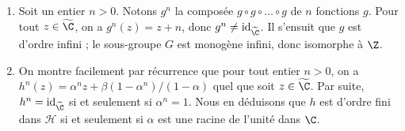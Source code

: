 \begin{enumerate}
  \item 
    Soit un entier $n > 0$.
    Notons $g^n$ la composée $g \circ g \circ \dots \circ g$ de $n$ fonctions $g$.
    Pour tout $z\in\widetilde{\C}$, on a $g^n(z) = z + n$, donc $g^n \neq \mathrm{id}_{\widetilde{\C}}$.
    Il s'ensuit que $g$ est d'ordre infini ; le sous-groupe $G$ est monogène infini, donc isomorphe à $\Z$.
  \item
    On montre facilement par récurrence que pour tout entier $n > 0$, on a $h^n(z) = \alpha^n z + \beta(1 - \alpha^n)/(1 - \alpha)$ quel que soit $z\in\widetilde{\C}$.
    Par suite, $h^n = \mathrm{id}_{\widetilde{\C}}$ si et seulement si $\alpha^n = 1$.
    Nous en déduisons que $h$ est d'ordre fini dans $\mathcal{H}$ si et seulement si $\alpha$ est une racine de l'unité dans $\C$.
\end{enumerate}
